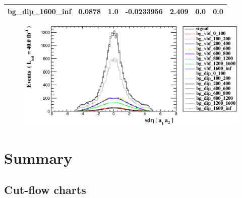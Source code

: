 \documentclass[a4paper, 10pt]{article}
\begin{document}
\begin{table}[H]
\begin{center}
\begin{tabular}{|m{23.0mm}|m{23.0mm}|m{18.0mm}|m{19.0mm}|m{19.0mm}|m{19.0mm}|m{19.0mm}|}
      \hline
      {\cellcolor{white}         bg\_dip\_1600\_inf}& {\cellcolor{white}         0.0878}& {\cellcolor{white}         1.0}& {\cellcolor{white}         -0.0233956}& {\cellcolor{white}         2.409}& {\cellcolor{green}         0.0}& {\cellcolor{green}         0.0}\\
\hline
    \end{tabular}
  \end{center}
\end{table}

\begin{figure}[H]
  \begin{center}
    \includegraphics[scale=0.45]{selection_16.eps}\\
\caption{   }
  \end{center}
\end{figure}
\newpage
\section{ Summary}

\subsection{Cut-flow charts}
\end{document}

